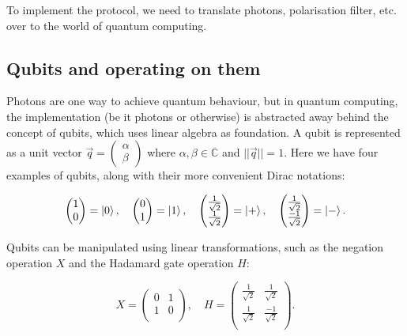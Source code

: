 \documentclass[oneside,a4paper]{article}
\begin{document}
To implement the protocol, we need to translate photons, polarisation filter, etc. over to the world of quantum computing.

\subsection{Qubits and operating on them}
Photons are one way to achieve quantum behaviour, but in quantum computing, the implementation (be it photons or otherwise) is abstracted away behind the concept of qubits, which uses linear algebra as foundation.
A qubit is represented as a unit vector $\vec{q}=\begin{pmatrix} \alpha \\ \beta\end{pmatrix}$ where $\alpha, \beta \in \mathbb{C}$ and $||\vec{q}||=1$.
Here we have four examples of qubits, along with their more convenient Dirac notations:

\begin{equation}
    \label{eq:qubits}
    \begin{pmatrix} 1 \\ 0\end{pmatrix} = \ket{0}, \quad
    \begin{pmatrix} 0 \\ 1\end{pmatrix} = \ket{1}, \quad
    \begin{pmatrix} \frac{1}{\sqrt{2}} \\ \frac{1}{\sqrt{2}}\end{pmatrix} = \ket{+}, \quad
    \begin{pmatrix} \frac{1}{\sqrt{2}} \\ \frac{-1}{\sqrt{2}}\end{pmatrix} = \ket{-}.
\end{equation}

Qubits can be manipulated using linear transformations, such as the negation operation $X$ and the Hadamard gate operation $H$:

\begin{equation}
    X = \begin{pmatrix} 0 & 1 \\ 1 & 0 \\\end{pmatrix}, \quad
    H = \begin{pmatrix} \frac{1}{\sqrt{2}} & \frac{1}{\sqrt{2}} \\ \frac{1}{\sqrt{2}} & \frac{-1}{\sqrt{2}} \\\end{pmatrix}.
\end{equation}
\end{document}
